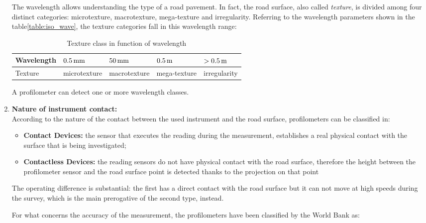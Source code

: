 \documentclass[tesi]{subfiles}
\begin{document}
\begin{enumerate}
\clearpage
The wavelength allows understanding the type of a road pavement. In fact, the road surface, also called \textit{texture}, is divided among four distinct categories: microtexture, macrotexture, mega-texture and irregularity. Referring to the wavelength parameters shown in the table\ref{table:iso_wave}, the texture categories fall in this wavelength range\cite{sayers1996interpretation}:
\vspace{0.5cm}
\begin{table}[H]
\centering
    \begin{tabular}{ | l | l | l | l | l |}

    \hline
    Wavelength & \quad $\num{0.5} \thinspace \si{\milli\meter}$ & \quad $\num{50} \thinspace \si{\milli\meter}$ & \quad $\num{0.5}\thinspace \si{\meter}$ & $ > \num{0.5} \thinspace \si{\meter} $  \\ \hline
   \quad  Texture & microtexture& macrotexture &mega-texture &	irregularity \\

\hline
    \end{tabular}
 \caption{Texture class in function of wavelength}
\end{table}
A profilometer can detect one or more wavelength classes.
\item \textbf{Nature of instrument contact:}\label{ssc:Instrument_Contact}\leavevmode\\
According to the nature of the contact between the used instrument and the road surface, profilometers can be classified in:
\begin{itemize}
\item \textbf{Contact Devices:} the sensor that executes the reading during the measurement, establishes a real physical contact with the surface that is being investigated;

\item \textbf{Contactless Devices:} the reading sensors do not have physical contact with the road surface, therefore the height between the profilometer sensor and the road surface point is detected thanks to the projection on that point
\end{itemize}
The operating difference is substantial: the first has a direct contact with the road surface but it can not move at high speeds during the survey, which is the main prerogative of the second type, instead. 

For what concerns the accuracy of the measurement, the profilometers have been classified by the World Bank\cite{sayers1995calculation} as:
\begin{description}


\end{description}
\end{enumerate}
\end{document}
